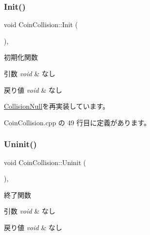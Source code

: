 \subsubsection{\texorpdfstring{Init()}{Init()}}
{\footnotesize\ttfamily void Coin\+Collision\+::\+Init (\begin{DoxyParamCaption}{ }\end{DoxyParamCaption})\hspace{0.3cm}{\ttfamily [override]}, {\ttfamily [virtual]}}



初期化関数 


\begin{DoxyParams}{引数}
{\em void} & なし \\
\hline
\end{DoxyParams}

\begin{DoxyRetVals}{戻り値}
{\em void} & なし \\
\hline
\end{DoxyRetVals}


\mbox{\hyperlink{class_collision_null_af5db1d080c1c0c5a1199062850d8a2ff}{Collision\+Null}}を再実装しています。



 Coin\+Collision.\+cpp の 49 行目に定義があります。

\mbox{\label{class_coin_collision_aa852afdcdbedcf82809df9c7fd99be9e}} 
\subsubsection{\texorpdfstring{Uninit()}{Uninit()}}
{\footnotesize\ttfamily void Coin\+Collision\+::\+Uninit (\begin{DoxyParamCaption}{ }\end{DoxyParamCaption})\hspace{0.3cm}{\ttfamily [override]}, {\ttfamily [virtual]}}



終了関数 


\begin{DoxyParams}{引数}
{\em void} & なし \\
\hline
\end{DoxyParams}

\begin{DoxyRetVals}{戻り値}
{\em void} & なし \\
\hline
\end{DoxyRetVals}


